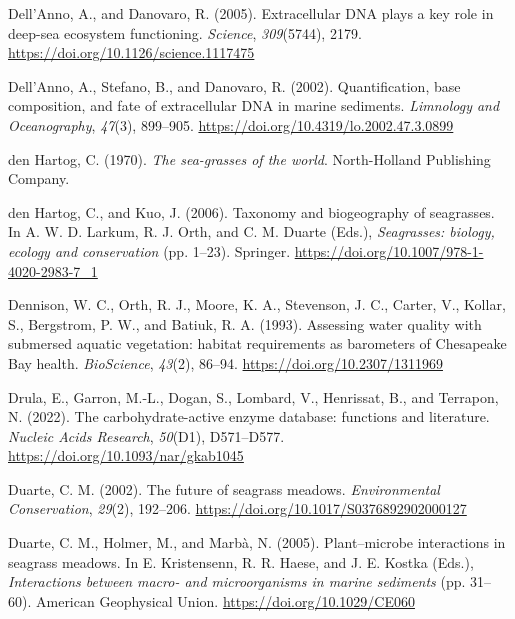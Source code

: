 \documentclass[
  12 pt,
]{book}
\newlength{\cslhangindent}
\newlength{\cslentryspacingunit} %
\newenvironment{CSLReferences}[2] %
 {%
  \setlength{\parindent}{0pt}
  \ifodd #1
  \let\oldpar\par
  \def\par{\hangindent=\cslhangindent\oldpar}
  \fi
  \setlength{\parskip}{#2\cslentryspacingunit}
 }%
 {}
\begin{document}
\begin{CSLReferences}{1}{0}
\leavevmode{}%
Dell'Anno, A., and Danovaro, R. (2005). Extracellular {DNA} plays a key role in deep-sea ecosystem functioning. \emph{Science}, \emph{309}(5744), 2179. \url{https://doi.org/10.1126/science.1117475}

\leavevmode{}%
Dell'Anno, A., Stefano, B., and Danovaro, R. (2002). Quantification, base composition, and fate of extracellular {DNA} in marine sediments. \emph{Limnology and Oceanography}, \emph{47}(3), 899--905. \url{https://doi.org/10.4319/lo.2002.47.3.0899}

\leavevmode{}%
den Hartog, C. (1970). \emph{The sea-grasses of the world}. North-Holland Publishing Company.

\leavevmode{}%
den Hartog, C., and Kuo, J. (2006). Taxonomy and biogeography of seagrasses. In A. W. D. Larkum, R. J. Orth, and C. M. Duarte (Eds.), \emph{Seagrasses: biology, ecology and conservation} (pp. 1--23). Springer. \url{https://doi.org/10.1007/978-1-4020-2983-7_1}

\leavevmode{}%
Dennison, W. C., Orth, R. J., Moore, K. A., Stevenson, J. C., Carter, V., Kollar, S., Bergstrom, P. W., and Batiuk, R. A. (1993). Assessing water quality with submersed aquatic vegetation: habitat requirements as barometers of {Chesapeake Bay} health. \emph{BioScience}, \emph{43}(2), 86--94. \url{https://doi.org/10.2307/1311969}

\leavevmode{}%
Drula, E., Garron, M.-L., Dogan, S., Lombard, V., Henrissat, B., and Terrapon, N. (2022). The carbohydrate-active enzyme database: functions and literature. \emph{Nucleic Acids Research}, \emph{50}(D1), D571--D577. \url{https://doi.org/10.1093/nar/gkab1045}

\leavevmode{}%
Duarte, C. M. (2002). The future of seagrass meadows. \emph{Environmental Conservation}, \emph{29}(2), 192--206. \url{https://doi.org/10.1017/S0376892902000127}

\leavevmode{}%
Duarte, C. M., Holmer, M., and Marbà, N. (2005). Plant--microbe interactions in seagrass meadows. In E. Kristensenn, R. R. Haese, and J. E. Kostka (Eds.), \emph{Interactions between macro- and microorganisms in marine sediments} (pp. 31--60). American Geophysical Union. \url{https://doi.org/10.1029/CE060}


\end{CSLReferences}
\end{document}
